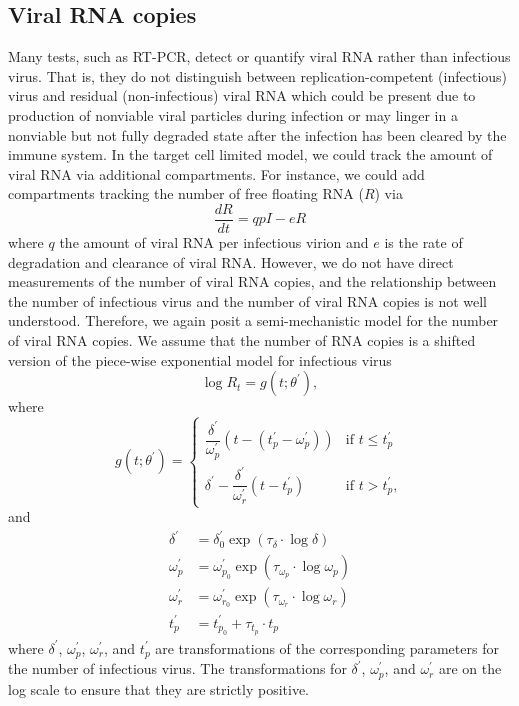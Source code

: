 \documentclass[12pt]{article}
\begin{document}
\subsection{Viral RNA copies}
Many tests, such as RT-PCR, detect or quantify viral RNA rather than infectious virus. That is, they do not distinguish between replication-competent (infectious) virus and residual (non-infectious) viral RNA which could be present due to production of nonviable viral particles during infection or may linger in a nonviable but not fully degraded state after the infection has been cleared by the immune system. In the target cell limited model, we could track the amount of viral RNA via additional compartments. For instance, we could add compartments tracking the number of  free floating RNA ($R$) via 
\begin{equation*}
    \dfrac{dR}{dt} = q p I - e R 
\end{equation*} 
where $q$ the amount of viral RNA per infectious virion and $e$ is the rate of degradation and clearance of viral RNA. However, we do not have direct measurements of the number of viral RNA copies, and the relationship between the number of infectious virus and the number of viral RNA copies is not well understood. Therefore, we again posit a semi-mechanistic model for the number of viral RNA copies. We assume that the number of RNA copies is a shifted version of the piece-wise exponential model for infectious virus
\begin{equation*}
    \log R_t = g(t; \theta^\prime),
\end{equation*}
where
\begin{equation*}
    g(t; \theta^\prime) = \begin{cases}
   \dfrac{\delta^\prime}{\omega^\prime_p} (t - (t^\prime_p - \omega^\prime_p)) & \text{if } t \leq t^\prime_p \\
    \delta^\prime - \dfrac{\delta^\prime}{\omega^\prime_r} (t - t^\prime_p) & \text{if } t > t^\prime_p,
\end{cases}
\end{equation*}
and
\begin{align*}
    \delta^\prime &= \delta^\prime_0 \exp(\tau_{\delta} \cdot \log \delta) \\
    \omega^\prime_{p} &= \omega^\prime_{p_0} \exp(\tau_{\omega_{p}} \cdot \log \omega_{p}) \\
    \omega^\prime_{r} &= \omega^\prime_{r_0} \exp(\tau_{\omega_{r}} \cdot \log \omega_{r}) \\
    t^\prime_{p} &= t^\prime_{p_0} + \tau_{t_p} \cdot t_{p} 
\end{align*}
where $\delta^\prime$, $\omega^\prime_{p}$, $\omega^\prime_{r}$, and $t^\prime_{p}$ are transformations of the corresponding parameters for the number of infectious virus. The transformations for $\delta^\prime$, $\omega^\prime_{p}$, and $\omega^\prime_{r}$ are on the log scale to ensure that they are strictly positive.
\end{document}
